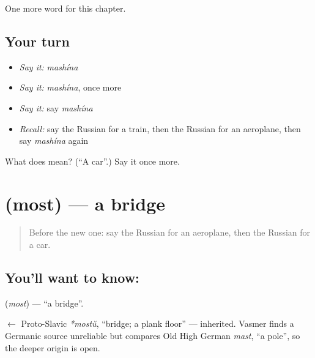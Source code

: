 \begin{grammarlens}[title={What you've built}]
One more word for this chapter.
\end{grammarlens}

\subsection*{Your turn}
\begin{itemize}
\raggedright
  \item \emph{Say it:} \emph{mashína}
  \item \emph{Say it:} \emph{mashína}, once more
  \item \emph{Say it:} say \emph{mashína}
  \item \emph{Recall:} say the Russian for a train, then the Russian for an aeroplane, then say \emph{mashína} again
\end{itemize}

\begin{tcolorbox}[breakable,colback=teal!4,colframe=teal!35!black,title={Before you move on}]
What does  mean? (\textquotedblleft{}A car\textquotedblright{}.) Say it once more.
\end{tcolorbox}
\section[\texorpdfstring{\ru{мост} (most)}{мост (most)}]{ (most) — a bridge}

\label{lesson:RU-C79-bridge}



\begin{quote}
Before the new one: say the Russian for an aeroplane, then the Russian for a car.
\end{quote}

\subsection*{You'll want to know: }
\textbf{} (\emph{most}) — \textquotedblleft{}a bridge\textquotedblright{}.

\begin{cousinweb}
\textbf{} $\leftarrow$ Proto-Slavic \emph{*mostŭ}, \textquotedblleft{}bridge; a plank floor\textquotedblright{} — inherited. Vasmer finds a Germanic source unreliable but compares Old High German \emph{mast}, \textquotedblleft{}a pole\textquotedblright{}, so the deeper origin is open.
\end{cousinweb}

